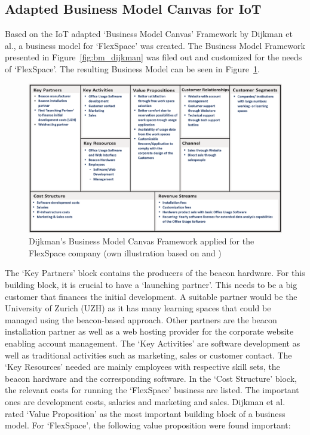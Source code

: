 	\subsection{Adapted Business Model Canvas for IoT}
		Based on the IoT adapted `Business Model Canvas' Framework by Dijkman et al., a business model for `FlexSpace' was created. The Business Model Framework presented in Figure~\ref{fig:bm_dijkman} was filed out and customized for the needs of `FlexSpace'. The resulting Business Model can be seen in Figure~\ref{fig:bmc_flex}.
			\begin{figure}[ht]
			    \begin{center}
			    \includegraphics[scale=0.50]{Talk11/bmc_flex.png}
			    \end{center}
			    \caption{Dijkman's Business Model Canvas Framework applied for the FlexSpace company (own illustration based on \cite{dijkman} and \cite{bmc})}
			    \label{fig:bmc_flex}
			\end{figure}
		The `Key Partners' block contains the producers of the beacon hardware. For this building block, it is crucial to have a `launching partner'. This needs to be a big customer that finances the initial development. A suitable partner would be the University of Zurich (UZH) as it has many learning spaces that could be managed using the beacon-based approach. Other partners are the beacon installation partner as well as a web hosting provider for the corporate website enabling account management. The `Key Activities' are software development as well as traditional activities such as marketing, sales or customer contact. The `Key Resources' needed are mainly employees with respective skill sets, the beacon hardware and the corresponding software. In the `Cost Structure' block, the relevant costs for running the `FlexSpace' business are listed. The important ones are development costs, salaries and marketing and sales. Dijkman et al. \cite{dijkman} rated `Value Proposition' as the most important building block of a business model. For `FlexSpace', the following value proposition were found important:


